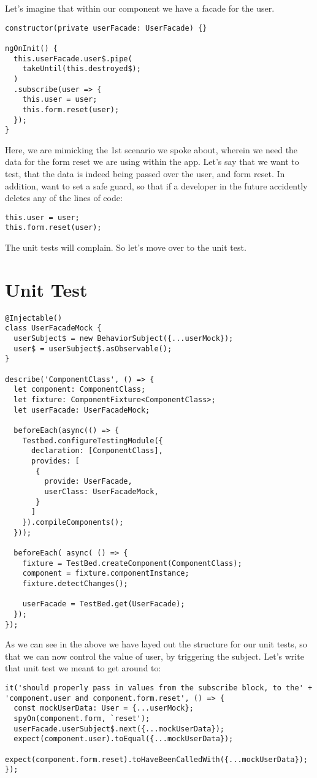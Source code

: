 Let's imagine that within our component we have a facade for the user.
\begin{lstlisting}
constructor(private userFacade: UserFacade) {}

ngOnInit() {
  this.userFacade.user$.pipe(
    takeUntil(this.destroyed$);
  )
  .subscribe(user => {
    this.user = user;
    this.form.reset(user);
  });
}
\end{lstlisting}

Here, we are mimicking the 1st scenario we spoke about, wherein we need the data
for the form reset we are using within the app. Let's say that we want to test,
that the data is indeed being passed over the user, and form reset. In addition,
want to set a safe guard, so that if a developer in the future accidently
deletes any of the lines of code:
\begin{verbatim}
this.user = user;
this.form.reset(user);
\end{verbatim}

The unit tests will complain. So let's move over to the unit test.

\section{ Unit Test }

\begin{lstlisting}
@Injectable()
class UserFacadeMock {
  userSubject$ = new BehaviorSubject({...userMock});
  user$ = userSubject$.asObservable();
}

describe('ComponentClass', () => {
  let component: ComponentClass;
  let fixture: ComponentFixture<ComponentClass>;
  let userFacade: UserFacadeMock;

  beforeEach(async(() => {
    Testbed.configureTestingModule({
      declaration: [ComponentClass],
      provides: [
       {
         provide: UserFacade,
         userClass: UserFacadeMock,
       }
      ]
    }).compileComponents();
  }));

  beforeEach( async( () => {
    fixture = TestBed.createComponent(ComponentClass);
    component = fixture.componentInstance;
    fixture.detectChanges();

    userFacade = TestBed.get(UserFacade);
  });
});
\end{lstlisting}

As we can see in the above we have layed out the structure for our unit tests,
so that we can now control the value of user, by triggering the subject. Let's
write that unit test we meant to get around to:
\begin{lstlisting}
it('should properly pass in values from the subscribe block, to the' +
'component.user and component.form.reset', () => {
  const mockUserData: User = {...userMock};
  spyOn(component.form, `reset');
  userFacade.userSubject$.next({...mockUserData});
  expect(component.user).toEqual({...mockUserData});
  expect(component.form.reset).toHaveBeenCalledWith({...mockUserData});
});
\end{lstlisting}


